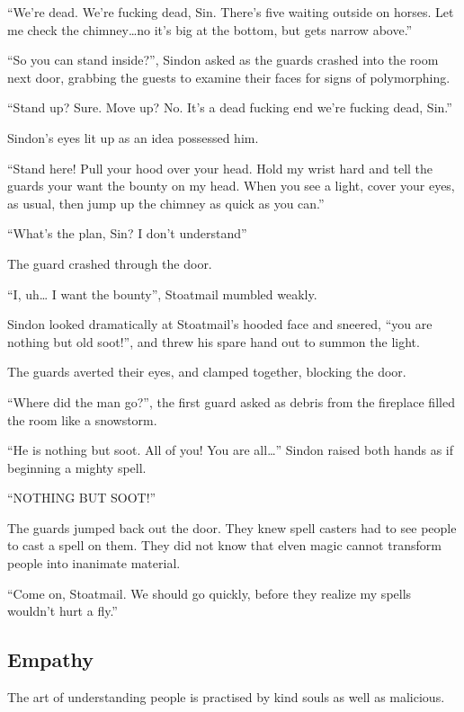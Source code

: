 \begin{multicols}{2}
\begin{exampletext}
  ``We're dead.
  We're fucking dead, Sin.
  There's five waiting outside on horses.
  Let me check the chimney\ldots no it's big at the bottom, but gets narrow above.''

  ``So you can stand inside?'', Sindon asked as the guards crashed into the room next door, grabbing the guests to examine their faces for signs of polymorphing.

  ``Stand up?
  Sure.
  Move up?
  No.
  It's a dead fucking end we're fucking dead, Sin.''

  Sindon's eyes lit up as an idea possessed him.

  ``Stand here!
  Pull your hood over your head.
  Hold my wrist hard and tell the guards your want the bounty on my head.
  When you see a light, cover your eyes, as usual, then jump up the chimney as quick as you can.''

  ``What's the plan, Sin?
  I don't understand''

  The guard crashed through the door.

  ``I, uh\ldots
  I want the bounty'', Stoatmail mumbled weakly.

  Sindon looked dramatically at Stoatmail's hooded face and sneered, ``you are nothing but old soot!'', and threw his spare hand out to summon the light.

  The guards averted their eyes, and clamped together, blocking the door.
  
  ``Where did the man go?'', the first guard asked as debris from the fireplace filled the room like a snowstorm.

  ``He is nothing but soot.
  All of you!
  You are all\ldots''
  Sindon raised both hands as if beginning a mighty spell.

  ``NOTHING BUT SOOT!''

  The guards jumped back out the door.
  They knew spell casters had to see people to cast a spell on them.
  They did not know that elven magic cannot transform people into inanimate material.

  ``Come on, Stoatmail.
  We should go quickly, before they realize my spells wouldn't hurt a fly.''

\end{exampletext}

\subsection{Empathy}

The art of understanding people is practised by kind souls as well as malicious.


\end{multicols}
